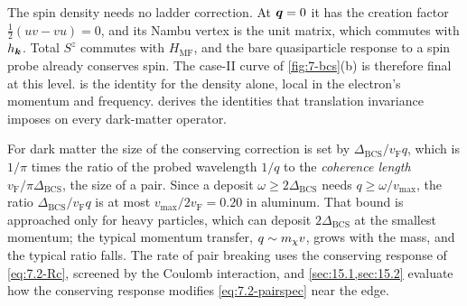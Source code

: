 The spin density needs no ladder correction. At $\bm{q} = 0$ it has the creation factor $\frac12(uv - vu) = 0$, and its Nambu vertex is the unit matrix, which commutes with $h_{\bm{k}}$. Total $S^z$ commutes with $H_{\mathrm{MF}}$, and the bare quasiparticle response to a spin probe already conserves spin. The case-II curve of \cref{fig:7-bcs}(b) is therefore final at this level.  is the identity for the density alone, local in the electron's momentum and frequency.  derives the identities that translation invariance imposes on every dark-matter operator.

For dark matter the size of the conserving correction is set by $\Delta_{\mathrm{BCS}}/v_{\mathrm{F}}q$, which is $1/\pi$ times the ratio of the probed wavelength $1/q$ to the \emph{coherence length} $v_{\mathrm{F}}/\pi\Delta_{\mathrm{BCS}}$, the size of a pair. Since a deposit $\omega \ge 2\Delta_{\mathrm{BCS}}$ needs $q \ge \omega/v_{\mathrm{max}}$, the ratio $\Delta_{\mathrm{BCS}}/v_{\mathrm{F}}q$ is at most $v_{\mathrm{max}}/2v_{\mathrm{F}} = 0.20$ in aluminum. That bound is approached only for heavy particles, which can deposit $2\Delta_{\mathrm{BCS}}$ at the smallest momentum; the typical momentum transfer, $q \sim m_{\chi} v$, grows with the mass, and the typical ratio falls. The rate of pair breaking uses the conserving response of \cref{eq:7.2-Rc}, screened by the Coulomb interaction, and \cref{sec:15.1,sec:15.2} evaluate how the conserving response modifies \cref{eq:7.2-pairspec} near the edge.

